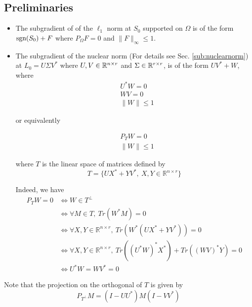 \subsection{Preliminaries}
\begin{itemize}
\item The subgradient of of the $\ell_1$ norm at $S_0$ supported on $\Omega$ is of the form $\text{sgn}(S_0)+F$ where $P_\Omega F = 0$ and $\|F\|_\infty \leq 1$.
\item The subgradient of the nuclear norm (For details see Sec. \ref{sub:nuclearnorm}) at $L_0 = U\Sigma V^*$ where $U, V \in {\mathbb R}^{n \times r}$ and $\Sigma \in {\mathbb R}^{r \times r}$, is of the form $U V^* + W$, where
\begin{equation}
\begin{aligned}
&U^*W = 0 \\
& WV = 0\\
& \|W\| \leq 1
\end{aligned}
\end{equation}

or equivalently

\begin{equation}
\begin{aligned}
& P_T W = 0 \\
& \|W\| \leq 1
\end{aligned}
\end{equation}

where $T$ is the linear space of matrices defined by
\[
T = \{UX^* + YV^*, \  X, Y \in \mathbb{R}^{n \times r}\}
\]

Indeed, we have
\begin{align*}
P_TW = 0
&\Leftrightarrow W \in T^\perp  \\
&\Leftrightarrow \forall M \in T, \ Tr(W^*M) = 0\\
&\Leftrightarrow \forall X, Y \in \mathbb{R}^{n \times r}, \ Tr(W^*(UX^* + YV^*)) = 0\\
&\Leftrightarrow \forall X, Y \in \mathbb{R}^{n \times r}, \ Tr((U^*W)^*X^*) + Tr((WV)^*Y) = 0\\
&\Leftrightarrow U^*W = WV^* = 0
\end{align*}


\end{itemize}

Note that the projection on the orthogonal of $T$ is given by
\begin{equation}
P_{T^\perp} M = (I - UU^*)M(I - VV^*) \label{property: p1}
\end{equation}

